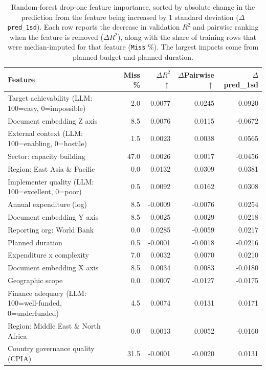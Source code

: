 \begin{table}[t]
\centering
\caption{Random-forest drop-one feature importance, sorted by absolute change in the prediction from the feature being increased by 1 standard deviation ($\Delta$ \texttt{pred\_1sd}). Each row reports the decrease in validation $R^2$ and pairwise ranking when the feature is removed ($\Delta R^2$\tnote{*}), along with the share of training rows that were median-imputed for that feature (\texttt{Miss} \%). The largest impacts come from planned budget and planned duration.%
}
\begin{tabular}{p{6cm}rrrr}
\toprule
Feature & Miss \% & $\Delta R^2$ $\uparrow$ & $\Delta$Pairwise $\uparrow$ & $\Delta$pred\_1sd \\
\midrule
Target achievability (LLM: 100=easy, 0=impossible) & 2.0 & 0.0077 & 0.0245 & 0.0920 \\[2pt]
Document embedding Z axis & 8.5 & 0.0076 & 0.0115 & -0.0672 \\[2pt]
External context (LLM: 100=enabling, 0=hostile) & 1.5 & 0.0023 & 0.0038 & 0.0565 \\[2pt]
Sector: capacity building & 47.0 & 0.0026 & 0.0017 & -0.0456 \\[2pt]
Region: East Asia \& Pacific & 0.0 & 0.0132 & 0.0309 & 0.0381 \\[2pt]
Implementer quality (LLM: 100=excellent, 0=poor) & 0.5 & 0.0092 & 0.0162 & 0.0308 \\[2pt]
Annual expenditure (log) & 8.5 & -0.0009 & -0.0076 & 0.0254 \\[2pt]
Document embedding Y axis & 8.5 & 0.0025 & 0.0029 & 0.0218 \\[2pt]
Reporting org: World Bank & 0.0 & 0.0285 & -0.0059 & 0.0217 \\[2pt]
Planned duration & 0.5 & -0.0001 & -0.0018 & -0.0216 \\[2pt]
Expenditure x complexity & 7.0 & 0.0032 & 0.0070 & 0.0210 \\[2pt]
Document embedding X axis & 8.5 & 0.0034 & 0.0083 & -0.0180 \\[2pt]
Geographic scope & 0.0 & 0.0007 & -0.0127 & -0.0175 \\[2pt]
Finance adequacy (LLM: 100=well-funded, 0=underfunded) & 4.5 & 0.0074 & 0.0131 & 0.0171 \\[2pt]
Region: Middle East \& North Africa & 0.0 & 0.0013 & 0.0052 & -0.0160 \\[2pt]
Country governance quality (CPIA) & 31.5 & -0.0001 & -0.0020 & 0.0131 \\[2pt]

\end{tabular}
\end{table}
